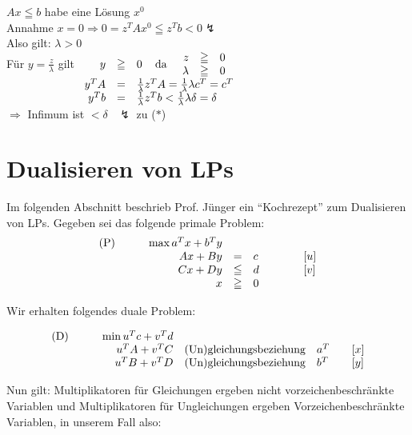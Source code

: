 \begin{enumerate}
$Ax \leqq b$ habe eine Lösung $x^{0}$\\
Annahme $ x = 0 \Rightarrow 0 = z^{T}A x^{0} \leqq z^{T}b < 0 \lightning$\\
Also gilt: $\lambda > 0$\\
Für $y=\frac{z}{\lambda}$ gilt $\begin{array}[t]{rcl} y &\geqq&0 \; \; \; 
\mbox{ da } \; \; \begin{array}{rcl}z&\geqq & 0\\\lambda &\geqq &
0\end{array}\\
y^{T} A &=& \frac{1}{\lambda} z^{T}A = \frac{1}{\lambda} \lambda c^{T} =
c^{T}\\
y^{T}b &=& \frac{1}{\lambda} z^{T}b < \frac{1}{\lambda} \lambda \delta =
\delta
\end{array}$\\
$\Rightarrow$ Infimum ist $< \delta \; \; \; \lightning$ zu ($\ast$)
\end{enumerate}

\section{Dualisieren von LPs}

Im folgenden Abschnitt beschrieb Prof. Jünger ein "`Kochrezept"' zum
Dualisieren von LPs. Gegeben sei das folgende primale Problem:
\[\begin{array}{rcl@{\hspace{7mm}}l}
\mbox{(P)}\hspace{10mm} \max a^{T}x + b^{T}y\\
A x + B y &=& c& [u]\\
C x + D y &\leqq& d \hspace{7mm}&[v]\\
x &\geqq& 0
\end{array}
\]

Wir erhalten folgendes duale Problem:

\[\begin{array}{rcl@{\hspace{7mm}}l}
\mbox{(D)}\hspace{10mm} \min u^{T}c + v^{T} d\\
u^{T}A+v^{T} C &\mbox{(Un)gleichungsbeziehung}& a^{T}&[x]\\
u^{T}B + v^{T}D &\mbox{(Un)gleichungsbeziehung}& b^{T}&[y]\\
\end{array}\]

Nun gilt: Multiplikatoren für Gleichungen ergeben nicht
vorzeichenbeschränkte Variablen und Multiplikatoren für Ungleichungen
ergeben Vorzeichenbeschränkte Variablen, in unserem Fall also:

